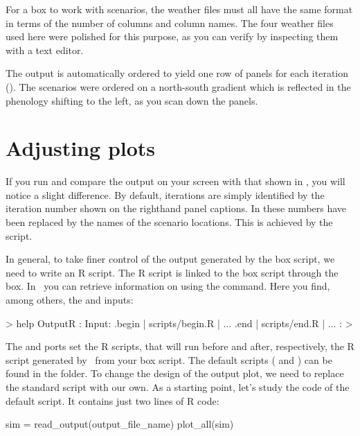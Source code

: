 For a  box to work with scenarios, the weather files must all have the same format in terms of the number of columns and column names. The four weather files used here were polished for this purpose, as you can verify by inspecting them with a text editor.

The output is automatically ordered to yield one row of panels for each iteration (). The scenarios were ordered on a north-south gradient which is reflected in the phenology shifting to the left, as you scan down the panels.

\section{Adjusting plots}
If you run  and compare the output on your screen with that shown in , you will notice a slight difference. By default, iterations are simply identified by the iteration number shown on the righthand panel captions. In 
 these numbers have been replaced by the names of the scenario locations. This is achieved by the  script.

In general, to take finer control of the output generated by the box script, we need to write an R script. The R script is linked to the box script through the  box. In \US\ you can retrieve information on  using the  command. Here you find, among others, the  and  inputs:

\begin{rdialog}
> help OutputR
:
Input:
.begin | scripts/begin.R | ...
.end   | scripts/end.R   | ...
:
>
\end{rdialog}

The  and  ports set the R scripts, that will run before and after, respectively, the R script generated by \US\ from your box script. The default scripts ( and ) can be found in the  folder. To change the design of the output plot, we need to replace the standard  script with our own. As a starting point, let's study the code of the default  script. It contains just two lines of R code:

\lstset{numbers=left}
\begin{rscript}
sim = read_output(output_file_name)
plot_all(sim)
\end{rscript}
\lstset{numbers=none}

